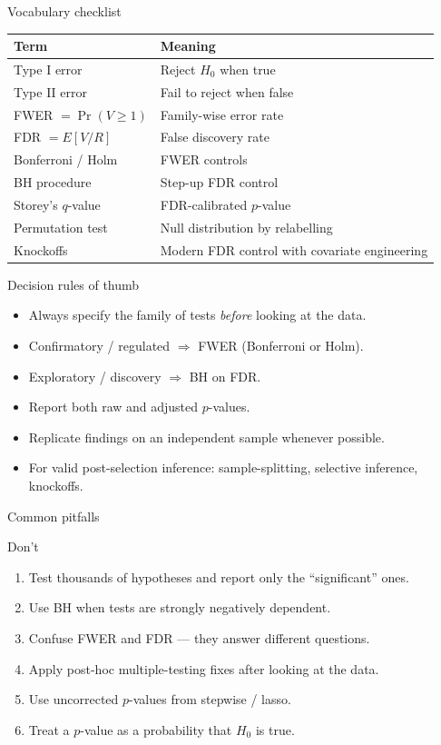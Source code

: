 \documentclass[aspectratio=169,11pt]{beamer}
\begin{document}
\begin{frame}{Vocabulary checklist}
  \footnotesize
  \begin{tabular}{ll}
    \toprule
    \textbf{Term} & \textbf{Meaning} \\
    \midrule
    Type I error & Reject $H_0$ when true \\
    Type II error & Fail to reject when false \\
    FWER $= \Pr(V \ge 1)$ & Family-wise error rate \\
    FDR $= E[V/R]$ & False discovery rate \\
    Bonferroni / Holm & FWER controls \\
    BH procedure & Step-up FDR control \\
    Storey's $q$-value & FDR-calibrated $p$-value \\
    Permutation test & Null distribution by relabelling \\
    Knockoffs & Modern FDR control with covariate engineering \\
    \bottomrule
  \end{tabular}
\end{frame}

\begin{frame}{Decision rules of thumb}
  \begin{itemize}
    \item Always specify the family of tests \emph{before} looking at
          the data.
    \item Confirmatory / regulated $\Rightarrow$ FWER (Bonferroni or
          Holm).
    \item Exploratory / discovery $\Rightarrow$ BH on FDR.
    \item Report both raw and adjusted $p$-values.
    \item Replicate findings on an independent sample whenever
          possible.
    \item For valid post-selection inference: sample-splitting,
          selective inference, knockoffs.
  \end{itemize}
\end{frame}

\begin{frame}{Common pitfalls}
  \begin{alertblock}{Don't}
    \begin{enumerate}
      \item Test thousands of hypotheses and report only the
            ``significant'' ones.
      \item Use BH when tests are strongly negatively dependent.
      \item Confuse FWER and FDR --- they answer different questions.
      \item Apply post-hoc multiple-testing fixes after looking at
            the data.
      \item Use uncorrected $p$-values from stepwise / lasso.
      \item Treat a $p$-value as a probability that $H_0$ is true.
    \end{enumerate}
  \end{alertblock}
\end{frame}
\end{document}
